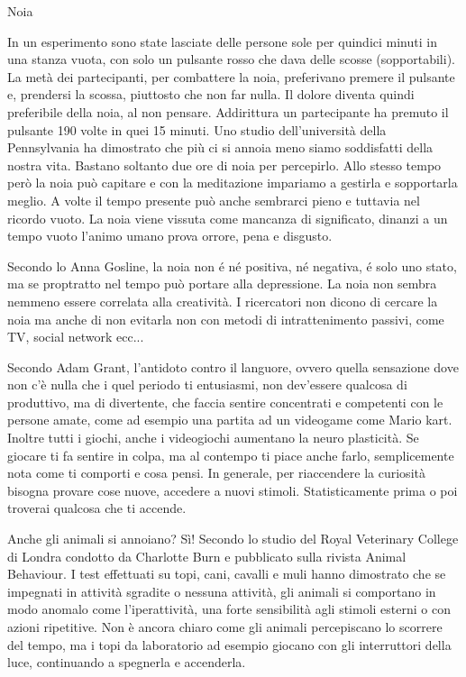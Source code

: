 \documentclass[12pt]{book} %
\begin{document}
\begin{mdframed}[linewidth=1pt]
Noia

In un esperimento sono state lasciate delle persone sole per quindici minuti in una stanza vuota, con solo un pulsante
rosso che dava delle scosse (sopportabili). La metà dei partecipanti, per combattere la noia, preferivano premere il
pulsante e, prendersi la scossa, piuttosto che non far nulla. Il dolore diventa quindi preferibile della noia, al non
pensare. Addirittura un partecipante ha premuto il pulsante 190 volte in quei 15
minuti. Uno studio dell'università della Pennsylvania
ha dimostrato che più ci si annoia meno siamo soddisfatti della nostra vita. Bastano soltanto due ore di noia per
percepirlo. Allo stesso tempo però la noia può capitare e con la meditazione impariamo a gestirla e sopportarla meglio.
A volte il tempo presente può anche sembrarci pieno e tuttavia nel ricordo vuoto. La noia viene vissuta come mancanza
di significato, dinanzi a un tempo vuoto l'animo umano prova orrore, pena e disgusto. 

Secondo lo Anna Gosline, la noia non é né positiva, né negativa, é solo uno stato, ma se proptratto nel tempo può portare alla depressione. La noia non sembra nemmeno essere correlata alla creatività. 
I ricercatori non dicono di cercare la noia ma anche di non evitarla non con metodi di intrattenimento passivi, come TV, social network ecc...

Secondo Adam Grant, l'antidoto contro il languore, ovvero quella sensazione dove non c'è nulla che i quel periodo ti
entusiasmi, non dev'essere qualcosa di produttivo, ma di divertente, che faccia sentire concentrati e competenti con le
persone amate, come ad esempio una partita ad un videogame come Mario
kart. Inoltre tutti i giochi, anche i videogiochi aumentano la neuro plasticità. Se giocare ti fa sentire in colpa, ma al
contempo ti piace anche farlo, semplicemente nota come ti comporti e cosa pensi. In generale, per riaccendere la curiosità bisogna provare cose nuove, accedere a nuovi stimoli. Statisticamente prima o poi troverai qualcosa che ti accende.

Anche gli animali si annoiano? Sì! Secondo lo studio del Royal Veterinary College di Londra condotto da Charlotte Burn e
pubblicato sulla rivista Animal Behaviour. I test effettuati su topi, cani, cavalli e muli hanno dimostrato che se
impegnati in attività sgradite o nessuna attività, gli animali si comportano in modo anomalo come l'iperattività, una
forte sensibilità agli stimoli esterni o con azioni ripetitive. Non è ancora chiaro come gli animali percepiscano lo
scorrere del tempo, ma i topi da laboratorio ad esempio giocano con gli interruttori della luce, continuando a
spegnerla e accenderla. 
\end{mdframed}
\end{document}
